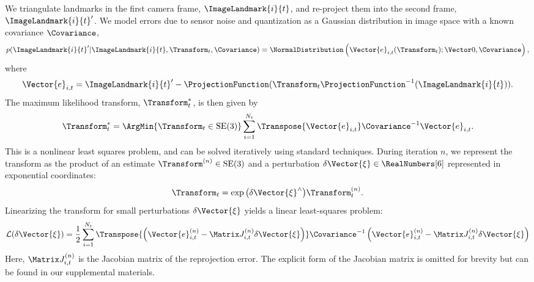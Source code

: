 We triangulate landmarks in the first camera frame, $\ImageLandmark{i}{t}$, and re-project
them into the second frame, $\ImageLandmark{i}{t}'$. We model errors due to sensor noise
and quantization as a Gaussian distribution in image space with a known covariance
$\Covariance$,
\begin{equation}
  p(\ImageLandmark{i}{t}' \vert \ImageLandmark{i}{t}, \Transform_t,
  \Covariance)
  =\NormalDistribution\left(\Vector{e}_{i,t}(\Transform_t); \Vector 0, \Covariance\right), 
\end{equation}
where
\begin{equation}
 \Vector{e}_{i,t} = \ImageLandmark{i}{t}' - \ProjectionFunction( \Transform_t 
    \ProjectionFunction^{-1}( \ImageLandmark{i}{t} ) ).	
   \label{eq:image_error}
\end{equation}
  The maximum likelihood transform,
$\Transform_t^*$, is then given by 
\begin{equation}
  \Transform_t^* = \ArgMin{\Transform_t\in\text{SE}(3)}\sum_{i=1}^{N_t} 
  \Transpose{\Vector{e}_{i,t}} \Covariance^{-1} \Vector{e}_{i,t}.
\end{equation}
This is a nonlinear least squares problem, and can be solved iteratively using
standard techniques. During iteration $n$, we represent the transform as the
product of an estimate $\Transform^{(n)}\in\text{SE}(3)$ and a perturbation
$\delta\Vector{\xi}\in\RealNumbers[6]$ represented in exponential
coordinates:
\begin{equation}
  \Transform_t = \exp{\left( \delta\Vector{\xi}^{\wedge}
  \right)} \Transform_t^{(n)}.
\end{equation}
Linearizing the transform for small perturbations $\delta\Vector{\xi}$
yields a linear least-squares problem:
\begin{equation}
  \mathcal{L}(\delta \Vector{\xi}) = \frac{1}{2}\sum_{i=1}^{N_t} 
  \Transpose{\left(\Vector{e}_{i,t}^{(n)}
  - \Matrix J_{i,t}^{(n)} \delta\Vector{\xi}\right)}
\Covariance^{-1}
 \left(\Vector{e}_{i,t}^{(n)}
 - \Matrix J_{i,t}^{(n)} \delta\Vector{\xi}\right)
  \end{equation}
Here, $\Matrix J_{i,t}^{(n)}$ is the Jacobian matrix of the reprojection error.
The explicit form of the Jacobian matrix is omitted for brevity but can be
found in our supplemental materials.

